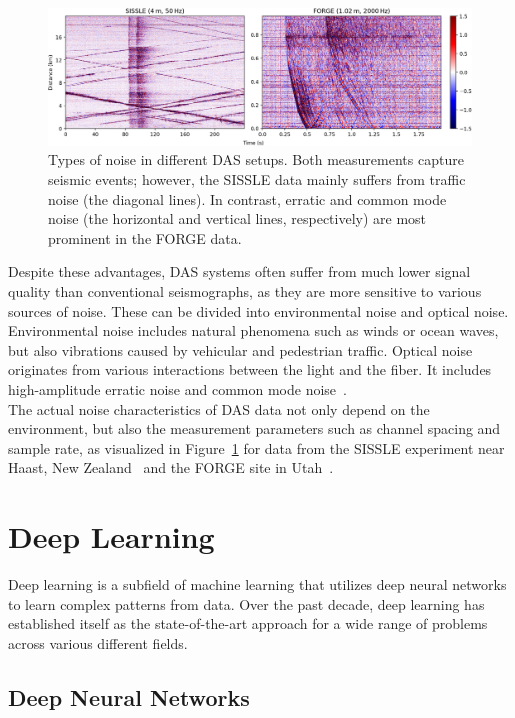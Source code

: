 \begin{figure}[b!]
    \includegraphics[width=\textwidth]{img/fig_2.2.png}
    \caption{
        Types of noise in different DAS setups.
        Both measurements capture seismic events; however, the SISSLE data mainly suffers from traffic noise
        (the diagonal lines).
        In contrast, erratic and common mode noise (the horizontal and vertical lines,
        respectively) are most prominent in the FORGE data.
    }
    \label{fig:das-noise}
\end{figure}

Despite these advantages, DAS systems often suffer from much lower signal quality than conventional seismographs,
as they are more sensitive to various sources of noise.
These can be divided into environmental noise and optical noise.
Environmental noise includes natural phenomena such as winds or ocean waves, but also vibrations caused by vehicular and
pedestrian traffic.
Optical noise originates from various interactions between the light and the fiber.
It includes high-amplitude erratic noise and common mode noise~\cite{IDF}.\\
The actual noise characteristics of DAS data not only depend on the environment, but also the measurement parameters
such as channel spacing and sample rate, as visualized in Figure~\ref{fig:das-noise} for data from the SISSLE experiment
near Haast, New Zealand~\cite{SISSLE} and the FORGE site in Utah~\cite{FORGE}.

\section{Deep Learning}

Deep learning is a subfield of machine learning that utilizes deep neural networks to learn complex patterns from data. 
Over the past decade, deep learning has established itself as the state-of-the-art approach for a wide range of problems
across various different fields. %

\subsection{Deep Neural Networks}

